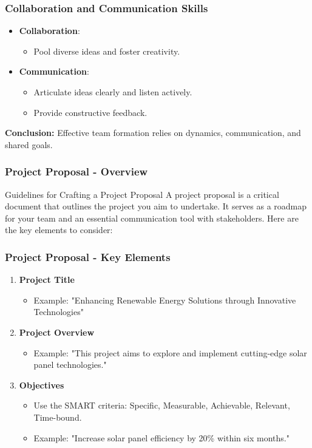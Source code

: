 \documentclass{beamer}
\begin{document}
\begin{frame}[fragile]
    \frametitle{Collaboration and Communication Skills}
    \begin{itemize}
        \item \textbf{Collaboration}:
            \begin{itemize}
                \item Pool diverse ideas and foster creativity.
            \end{itemize}

        \item \textbf{Communication}:
            \begin{itemize}
                \item Articulate ideas clearly and listen actively.
                \item Provide constructive feedback.
            \end{itemize}
    \end{itemize}
    
    \textbf{Conclusion:} Effective team formation relies on dynamics, communication, and shared goals.
\end{frame}

\begin{frame}[fragile]
    \frametitle{Project Proposal - Overview}
    \begin{block}{Guidelines for Crafting a Project Proposal}
        A project proposal is a critical document that outlines the project you aim to undertake. It serves as a roadmap for your team and an essential communication tool with stakeholders. Here are the key elements to consider:
    \end{block}
\end{frame}

\begin{frame}[fragile]
    \frametitle{Project Proposal - Key Elements}
    \begin{enumerate}
        \item \textbf{Project Title}
            \begin{itemize}
                \item Example: "Enhancing Renewable Energy Solutions through Innovative Technologies"
            \end{itemize}
        \item \textbf{Project Overview}
            \begin{itemize}
                \item Example: "This project aims to explore and implement cutting-edge solar panel technologies."
            \end{itemize}
        \item \textbf{Objectives}
            \begin{itemize}
                \item Use the SMART criteria: Specific, Measurable, Achievable, Relevant, Time-bound.
                \item Example: "Increase solar panel efficiency by 20\% within six months."
            \end{itemize}
    \end{enumerate}
\end{frame}
\end{document}
